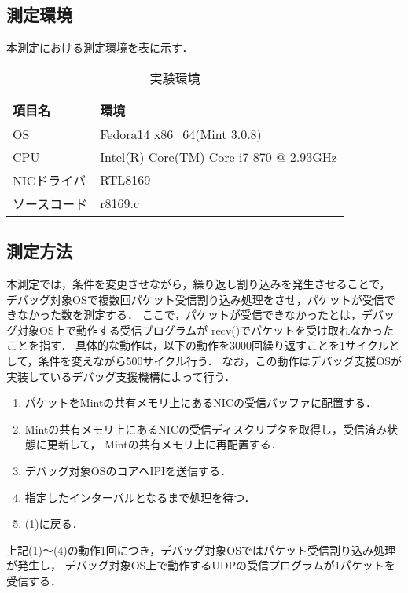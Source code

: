 \documentclass[12pt]{jsarticle}
\begin{document}
\subsection{測定環境}
本測定における測定環境を表に示す．
\begin{table}[htbp]
    \caption{実験環境}
    \label{kankyou}
    \begin{center}
        \begin{tabular}{l|l}   \hline \hline 
            項目名      & 環境    \\ \hline
            OS          & Fedora14 x86\_64(Mint 3.0.8)  \\ 
            CPU         & Intel(R) Core(TM) Core i7-870 @ 2.93GHz \\ 
            NICドライバ & RTL8169    \\ 
            ソースコード& r8169.c \\ \hline
        \end{tabular}
    \end{center}
\end{table}

\subsection{測定方法}
本測定では，条件を変更させながら，繰り返し割り込みを発生させることで，
デバッグ対象OSで複数回パケット受信割り込み処理をさせ，パケットが受信できなかった数を測定する．
ここで，パケットが受信できなかったとは，デバッグ対象OS上で動作する受信プログラムが
recv()でパケットを受け取れなかったことを指す．
具体的な動作は，以下の動作を3000回繰り返すことを1サイクルとして，条件を変えながら500サイクル行う．
なお，この動作はデバッグ支援OSが実装しているデバッグ支援機構によって行う．
\begin{enumerate}
    \item パケットをMintの共有メモリ上にあるNICの受信バッファに配置する．
    \item Mintの共有メモリ上にあるNICの受信ディスクリプタを取得し，受信済み状態に更新して，
        Mintの共有メモリ上に再配置する．
    \item デバッグ対象OSのコアへIPIを送信する．
    \item 指定したインターバルとなるまで処理を待つ．
    \item (1)に戻る．
\end{enumerate}
上記(1)〜(4)の動作1回につき，デバッグ対象OSではパケット受信割り込み処理が発生し，
デバッグ対象OS上で動作するUDPの受信プログラムが1パケットを受信する．
\end{document}

